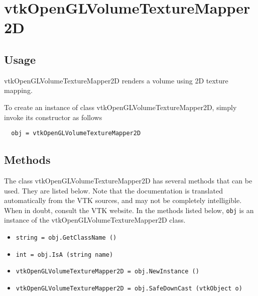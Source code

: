 \section{vtkOpenGLVolumeTextureMapper2D}

\subsection{Usage}

 vtkOpenGLVolumeTextureMapper2D renders a volume using 2D texture mapping.

To create an instance of class vtkOpenGLVolumeTextureMapper2D, simply
invoke its constructor as follows
\begin{verbatim}
  obj = vtkOpenGLVolumeTextureMapper2D
\end{verbatim}
\subsection{Methods}

The class vtkOpenGLVolumeTextureMapper2D has several methods that can be used.
  They are listed below.
Note that the documentation is translated automatically from the VTK sources,
and may not be completely intelligible.  When in doubt, consult the VTK website.
In the methods listed below, \verb|obj| is an instance of the vtkOpenGLVolumeTextureMapper2D class.
\begin{itemize}
\item  \verb|string = obj.GetClassName ()|

\item  \verb|int = obj.IsA (string name)|

\item  \verb|vtkOpenGLVolumeTextureMapper2D = obj.NewInstance ()|

\item  \verb|vtkOpenGLVolumeTextureMapper2D = obj.SafeDownCast (vtkObject o)|

\end{itemize}
